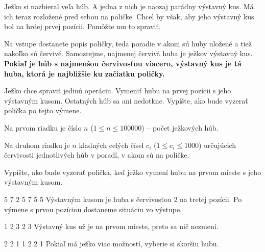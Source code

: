 



Ježko si nazbieral veľa húb. A jedna z nich je naozaj parádny výstavný kus. Má
ich teraz rozložené pred sebou na poličke. Chcel by však, aby jeho výstavný kus
bol na hrdej prvej pozícii. Pomôžte mu to spraviť.


Na vstupe dostanete popis poličky, teda poradie v akom sú huby uložené a tiež
nakoľko sú červivé.  Samozrejme, najmenej červivá huba je ježkov výstavný kus.
\textbf{Pokiaľ je húb s najmenšou červivosťou viacero, výstavný kus je tá
huba, ktorá je najbližšie ku začiatku poličky.} 

Ježko chce spraviť jedinú operáciu. Vymeniť hubu na prvej pozícii s jeho
výstavným kusom. Ostatných húb sa ani nedotkne.  Vypíšte, ako bude vyzerať
polička po tejto výmene.


Na prvom riadku je číslo $n$ ($1 \leq n \leq 100000$) -- počet ježkových
húb.

Na druhom riadku je $n$ kladných celých čísel $c_i$ ($1 \leq c_i \leq 1000$)
určujúcich červivosti jednotlivých húb v poradí, v akom sú na poličke.


Vypíšte, ako bude vyzerať polička, keď ježko vymení hubu na prvom mieste s jeho
výstavným kusom.


5 7 2 5
 7 5 5
\komentar
Výstavným kusom je huba s červivosťou $2$ na tretej pozícii. Po výmene s prvou pozíciou dostaneme
situáciu vo výstupe.
\koniec

1 2 3
 2 3
\komentar
Výstavný kus už je na prvom mieste, preto sa nič nezmení.
\koniec

2 2 1 1
 2 2 1
\komentar
Pokiaľ má ježko viac možností, vyberie si skoršiu hubu.
\koniec


